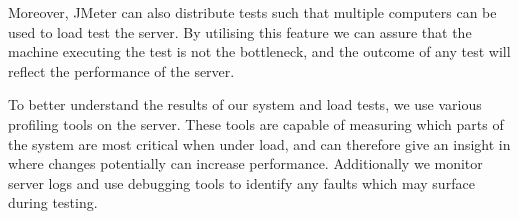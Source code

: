 Moreover, JMeter can also distribute tests such that multiple computers can be used to load test the server.
By utilising this feature we can assure that the machine executing the test is not the bottleneck, and the outcome of any test will reflect the performance of the server.

\bigskip
To better understand the results of our system and load tests, we use various profiling tools on the server.
These tools are capable of measuring which parts of the system are most critical when under load, and can therefore give an insight in where changes potentially can increase performance.
Additionally we monitor server logs and use debugging tools to identify any faults which may surface during testing.
